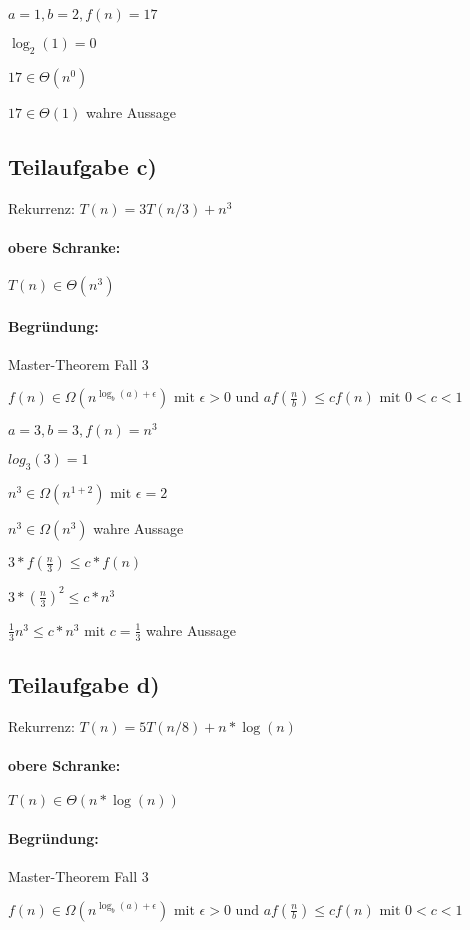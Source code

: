 \documentclass[12pt]{scrartcl}%
\theoremstyle{nonumberplain}
\newcommand{\bT}[1]{\Theta (#1)}
\newcommand{\bOg}[1]{\Omega (#1)}
\begin{document}
$a=1, b=2, f(n)=17$

$\log_2 (1) = 0$

$17 \in \bT{n^0}$

$17 \in \bT{1}$ wahre Aussage

\subsection*{Teilaufgabe c)}
Rekurrenz: $ T(n) = 3T(n/3) + n^3 $

\paragraph{obere Schranke:} $ T(n) \in \bT{n^3} $

\paragraph{Begründung:} Master-Theorem Fall 3

$f(n) \in \bOg{n^{\log_b (a) + \epsilon}} \text{ mit } \epsilon > 0 \text{ und } af(\frac{n}{b}) \le cf(n) \text{ mit } 0 < c < 1$ 

$a=3, b=3, f(n)=n^3$

$log_3 (3) = 1$

$n^3 \in \bOg{n^{1+2}} \text{ mit } \epsilon = 2$

$n^3 \in \bOg{n^3}$  wahre Aussage

$3*f(\frac{n}{3}) \le c * f(n)$

$3*\left( \frac{n}{3} \right) ^2 \le c * n^3$

$\frac{1}{3} n^3 \le c * n^3 \text{ mit } c=\frac{1}{3}$ wahre Aussage

\newpage

\subsection*{Teilaufgabe d)}
Rekurrenz: $ T(n) = 5T(n/8) + n*\log(n) $

\paragraph{obere Schranke:} $ T(n) \in \bT{n*\log(n)} $

\paragraph{Begründung:} Master-Theorem Fall 3

$f(n) \in \bOg{n^{\log_b (a) + \epsilon}} \text{ mit } \epsilon > 0 \text{ und } af(\frac{n}{b}) \le cf(n) \text{ mit } 0 < c < 1$
\end{document}
